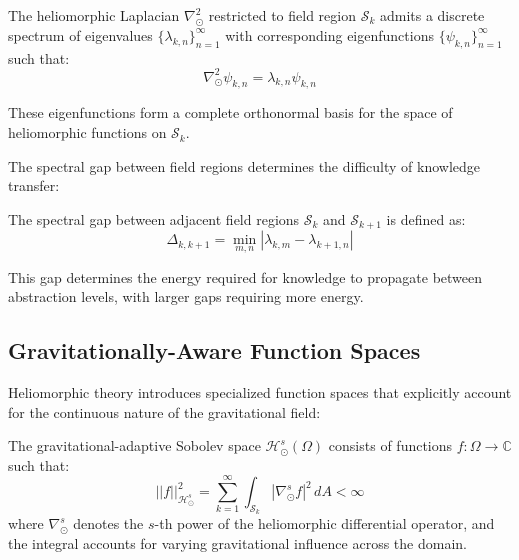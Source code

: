 \begin{theorem}
The heliomorphic Laplacian $\nabla_{\odot}^2$ restricted to field region $\mathcal{S}_k$ admits a discrete spectrum of eigenvalues $\{\lambda_{k,n}\}_{n=1}^{\infty}$ with corresponding eigenfunctions $\{\psi_{k,n}\}_{n=1}^{\infty}$ such that:
\begin{equation}
\nabla_{\odot}^2 \psi_{k,n} = \lambda_{k,n} \psi_{k,n}
\end{equation}

These eigenfunctions form a complete orthonormal basis for the space of heliomorphic functions on $\mathcal{S}_k$.
\end{theorem}

The spectral gap between field regions determines the difficulty of knowledge transfer:

\begin{proposition}
The spectral gap between adjacent field regions $\mathcal{S}_k$ and $\mathcal{S}_{k+1}$ is defined as:
\begin{equation}
\Delta_{k,k+1} = \min_{m,n} |\lambda_{k,m} - \lambda_{k+1,n}|
\end{equation}

This gap determines the energy required for knowledge to propagate between abstraction levels, with larger gaps requiring more energy.
\end{proposition}

\subsection{Gravitationally-Aware Function Spaces}

Heliomorphic theory introduces specialized function spaces that explicitly account for the continuous nature of the gravitational field:

\begin{definition}
The gravitational-adaptive Sobolev space $\mathcal{H}_{\odot}^s(\Omega)$ consists of functions $f: \Omega \rightarrow \mathbb{C}$ such that:
\begin{equation}
||f||_{\mathcal{H}_{\odot}^s}^2 = \sum_{k=1}^{\infty} \int_{\mathcal{S}_k} |\nabla_{\odot}^s f|^2 \, dA < \infty
\end{equation}
where $\nabla_{\odot}^s$ denotes the $s$-th power of the heliomorphic differential operator, and the integral accounts for varying gravitational influence across the domain.
\end{definition}

